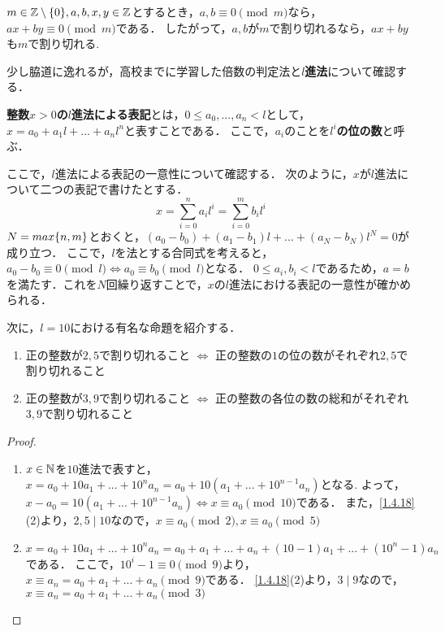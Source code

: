     \begin{cor} \label{1.4.19}
      $ m \in \mathbb{Z} \setminus \lbrace0\rbrace, a,b,x,y \in \mathbb{Z}$とするとき，$a,b \equiv 0 \pmod m$なら，
      $ax + by \equiv 0 \pmod m$である．
      したがって，$a,b$が$m$で割り切れるなら，$ax+by$も$m$で割り切れる.
    \end{cor}

    少し脇道に逸れるが，高校までに学習した倍数の判定法と\textbf{$l$進法}について確認する．

    \begin{dfn} \label{1.4.20}
      \textbf{整数$x>0$の$l$進法による表記}とは，$0 \leq a_0, ... , a_n < l$として，
      $x = a_0 + a_1 l + ... + a_n l^n$と表すことである．
      ここで，$a_i$のことを\textbf{$l^i$の位の数}と呼ぶ．
    \end{dfn}

    ここで，$l$進法による表記の一意性について確認する．
    次のように，$x$が$l$進法について二つの表記で書けたとする．
    \begin{displaymath}
      x = \sum_{i=0}^{n}a_i l^i = \sum_{i=0}^{m}b_i l^i
    \end{displaymath}
    $N = max \lbrace n, m\rbrace$とおくと，$(a_0 - b_0) + (a_1 - b_1) l + ... + (a_N - b_N) l^N = 0$が成り立つ．
    ここで，$l$を法とする合同式を考えると，$a_0 - b_0 \equiv 0 \pmod l \iff a_0 \equiv b_0 \pmod l$となる．
    $0 \leq a_i, b_i < l$であるため，$a=b$を満たす．これを$N$回繰り返すことで，$x$の$l$進法における表記の一意性が確かめられる．

    次に，$l=10$における有名な命題を紹介する．

    \begin{prop} \label{1.4.21}
      \begin{enumerate}
        \item 正の整数が$2,5$で割り切れること $\iff$ 正の整数の$1$の位の数がそれぞれ$2,5$で割り切れること
        \item 正の整数が$3,9$で割り切れること $\iff$ 正の整数の各位の数の総和がそれぞれ$3,9$で割り切れること
      \end{enumerate}
    \end{prop}

    \begin{proof}
      \begin{enumerate}
        \item $x \in \mathbb{N}$を$10$進法で表すと，$x=a_0 + 10a_1 + ... + 10^n a_n = a_0 + 10(a_1 + ... + 10^{n-1}a_n)$となる.
        よって，$x-a_0 = 10(a_1 + ... + 10^{n-1}a_n) \iff x \equiv a_0 \pmod {10}$である．
        また，\cref{1.4.18}(2)より，$2,5 \mid 10$なので，$x \equiv a_0 \pmod 2, x \equiv a_0 \pmod 5$
        \item $x = a_0 + 10a_1 + ... + 10^n a_n = a_0 + a_1 + ... + a_n + (10 - 1)a_1 + ... + (10^n - 1) a_n$である．
        ここで，$10^i - 1 \equiv 0 \pmod 9$より，$x \equiv a_n = a_0 + a_1 + ... + a_n \pmod 9$である．
        \cref{1.4.18}(2)より，$3 \mid 9$なので，$x \equiv a_n = a_0 + a_1 + ... + a_n \pmod 3$
      \end{enumerate}
    \end{proof}

